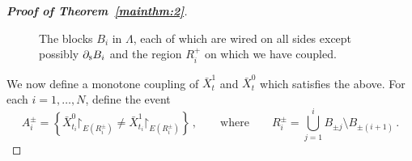 \documentclass[reqno,11pt]{amsart}
\numberwithin{equation}{section}
\renewcommand{\restriction}{\mathord{\upharpoonright}}
\theoremstyle{definition}{
\newtheorem{example}[theorem]{Example}
\newtheorem{definition}[theorem]{Definition}
\newtheorem*{definition*}{Definition}
\newtheorem{problem}[theorem]{Problem}
\newtheorem{question}[theorem]{Question}
\newtheorem{remark}[theorem]{Remark}
}
\newcommand{\south}{{\textsc{s}}}
\begin{document}
\begin{proof}[\textbf{\emph{Proof of Theorem~\ref{mainthm:2}}}]
\begin{figure}
\caption{The blocks $B_{i}$ in $\Lambda$, each of which are wired on all sides except possibly $\partial_\south B_{i}$ and the region $R_i^+$ on which we have coupled.} 
\label{fig:regions}
\end{figure}


We now define a monotone coupling of $\bar X_{t}^1$ and $\bar X_{t}^0$ which satisfies the above. For each $i=1,\ldots,N$, define the event
\[
A_i^{\pm}= \left\{ \bar X_{t_{i}}^0\restriction_{E(R_i^{\pm})} \neq  \bar X_{t_{i}}^1\restriction_{E(R_i^{\pm})} \right\}\,,\qquad\mbox{where}\qquad
R^{\pm}_i=\bigcup_{j=1}^{i} B_{\pm j}\setminus B_{\pm (i+1)}\,.
\]


\end{proof}
\end{document}
